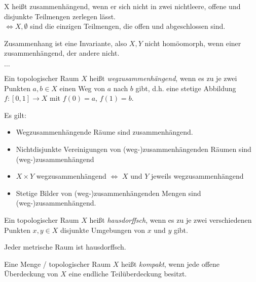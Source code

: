 \begin{defi}[Zusammenhang]
  X heißt zusammenhängend, wenn er sich nicht in zwei nichtleere, offene und
  disjunkte Teilmengen zerlegen lässt.\\
  $\Leftrightarrow X, \emptyset$ sind die einzigen Teilmengen, die offen und abgeschlossen sind.
\end{defi}

\begin{bem}
  Zusammenhang ist eine Invariante, also $X, Y$ nicht homöomorph, 
  wenn einer zusammenhängend, der andere nicht.
\end{bem}

$\dots$

\begin{defi}[Wegzusammenhang]
Ein topologischer Raum $X$ heißt \emph{wegzusammenhängend}, 
wenn es zu je zwei Punkten $a, b \in X$ 
einen Weg von $a$ nach $b$ gibt, 
d.h. eine stetige Abbildung $f: [0, 1] \to X$ mit $f(0) = a$, $f(1) = b$.
\end{defi}

\begin{bem} Es gilt:
\begin{itemize}
\item Wegzusammenhängende Räume sind zusammenhängend.
\item Nichtdisjunkte Vereinigungen von (weg-)zusammenhängenden Räumen sind (weg-)zusammenhängend
\item $X \times Y$ wegzusammenhängend $\Leftrightarrow$ $X$ und $Y$ jeweils wegzusammenhängend
\item Stetige Bilder von (weg-)zusammenhängenden Mengen sind (weg-)zusammenhängend. \\
\end{itemize}
\end{bem}


\begin{defi}[Hausdorffsch]
Ein topologischer Raum $X$ heißt \emph{hausdorffsch}, wenn es zu je zwei verschiedenen Punkten $x, y \in X$ disjunkte Umgebungen von $x$ und $y$ gibt.
\end{defi}

\begin{bem} Jeder metrische Raum ist hausdorffsch. \\
\end{bem}

\begin{defi}[Kompaktheit]
Eine Menge / topologischer Raum $X$ heißt \emph{kompakt}, wenn jede offene Überdeckung von $X$ eine endliche Teilüberdeckung besitzt.
\end{defi}

